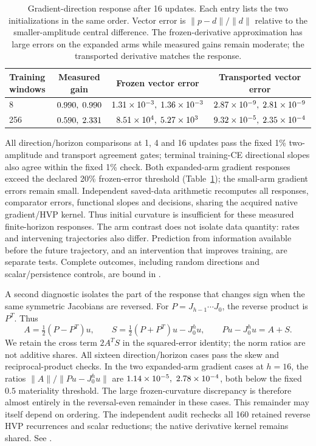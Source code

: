 \documentclass[11pt,letterpaper]{article}
\begin{document}
\begin{table}[htbp]
\centering\small
\begin{tabular}{@{}lccc@{}}
\toprule
Training windows & Measured gain & Frozen vector error & Transported vector error \\
\midrule
8 & $0.990,\; 0.990$ & $1.31\times10^{-3},\; 1.36\times10^{-3}$ & $2.87\times10^{-9},\; 2.81\times10^{-9}$ \\
256 & $0.590,\; 2.331$ & $8.51\times10^{4},\; 5.27\times10^{3}$ & $9.32\times10^{-5},\; 2.35\times10^{-4}$ \\
\bottomrule
\end{tabular}
\caption{Gradient-direction response after 16 updates. Each entry lists the two initializations in the
same order. Vector error is $\|p-d\|/\|d\|$ relative to the smaller-amplitude central difference.
The frozen-derivative approximation has large errors on the expanded arms while measured gains
remain moderate; the transported derivative matches the response.}
\label{tab:lmresponse}
\end{table}

All direction/horizon comparisons at 1, 4 and 16 updates pass the fixed 1\% two-amplitude and
transport agreement gates; terminal training-CE directional slopes also agree within the fixed
1\% check. Both expanded-arm gradient responses exceed the declared 20\% frozen-error threshold
(Table~\ref{tab:lmresponse}); the small-arm gradient errors remain small. Independent saved-data
arithmetic recomputes all responses, comparator errors, functional slopes and decisions, sharing
the acquired native gradient/HVP kernel. Thus initial curvature is insufficient for these measured
finite-horizon responses. The arm contrast does not isolate data quantity: rates and intervening
trajectories also differ. Prediction from information available before the future trajectory,
and an intervention that improves training, are separate tests. Complete outcomes, including
random directions and scalar/persistence controls, are bound in
.

A second diagnostic isolates the part of the response that changes sign when
the same symmetric Jacobians are reversed. For $P=J_{h-1}\cdots J_0$,
the reverse product is $P^T$. Thus
\begin{equation}
 A=\tfrac12(P-P^T)u,\qquad
 S=\tfrac12(P+P^T)u-J_0^h u,\qquad
 Pu-J_0^h u=A+S.
\end{equation}
We retain the cross term $2A^TS$ in the squared-error identity; the norm ratios
are not additive shares. All sixteen direction/horizon cases pass the skew
and reciprocal-product checks. In the two expanded-arm gradient cases at
$h=16$, the ratios $\|A\|/\|Pu-J_0^h u\|$ are
$1.14\times10^{-5},\ 2.78\times10^{-4}$, both below the fixed $0.5$ materiality threshold.
The large frozen-curvature discrepancy is therefore almost entirely in the
reversal-even remainder in these cases. This remainder may itself depend on
ordering. The independent audit rechecks all 160 retained reverse HVP
recurrences and scalar reductions; the native derivative kernel remains shared.
See .
\end{document}
